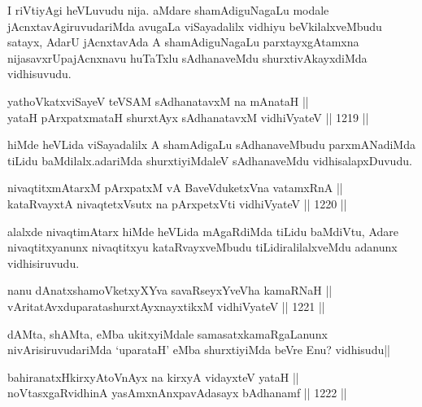 \begin{artha}
I riVtiyAgi heVLuvudu nija. aMdare shamAdiguNagaLu modale jAcnxtavAgiruvudariMda avugaLa viSayadalilx vidhiyu beVkilalxveMbudu satayx, AdarU jAcnxtavAda A shamAdiguNagaLu parxtayxgAtamxna nijasavxrUpajAcnxnavu huTaTxlu sAdhanaveMdu shurxtivAkayxdiMda vidhisuvudu.
\end{artha}


\begin{shl}
yathoVkatxviSayeV teVSAM sAdhanatavxM na mAnataH || \\
yataH pArxpatxmataH shurxtAyx sAdhanatavxM vidhiVyateV \hfill || 1219 ||  
\end{shl}

\begin{artha}
hiMde heVLida viSayadalilx A shamAdigaLu sAdhanaveMbudu parxmANadiMda tiLidu baMdilalx.adariMda shurxtiyiMdaleV sAdhanaveMdu vidhisalapxDuvudu.
\end{artha}

\begin{shl}
nivaqtitxmAtarxM pArxpatxM vA BaveVduketxVna vatamxRnA || \\
kataRvayxtA nivaqtetxVsutx na pArxpetxVti vidhiVyateV \hfill || 1220 ||  
\end{shl}

\begin{artha}
alalxde nivaqtimAtarx hiMde heVLida mAgaRdiMda tiLidu baMdiVtu, Adare nivaqtitxyanunx nivaqtitxyu kataRvayxveMbudu tiLidiralilalxveMdu adanunx vidhisiruvudu.
\end{artha}


\begin{shl}
nanu dAnatxshamoVketxyXYva savaRseyxYveVha kamaRNaH || \\
vAritatAvxduparatashurxtAyx\s nayxtikxM vidhiVyateV \hfill || 1221 ||  
\end{shl}

\begin{artha}
dAMta, shAMta, eMba ukitxyiMdale samasatxkamaRgaLanunx nivArisiruvudariMda `uparataH' eMba shurxtiyiMda beVre Enu? vidhisudu||
\end{artha}

\begin{shl}
bahiranatxHkirxyAtoV\s nAyx na kirxyA vidayxteV yataH || \\
noVtasxgaRvidhinA yasAmxnAnxpavAdasayx bAdhanamf \hfill || 1222 ||  
\end{shl}

